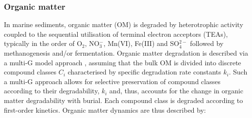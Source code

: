 \documentclass[gmd, manuscript]{copernicus}
\begin{document}
\subsubsection{Organic matter}
In marine sediments, organic matter (OM) is degraded by heterotrophic activity coupled to the sequential utilisation of terminal electron acceptors (TEAs), typically in the order of O$_2$, NO$_3^-$, Mn(VI), Fe(III) and SO$_4^{2-}$ 
followed by methanogenesis and/or fermentation. Organic matter degradation is described via a multi-G model approach \citep[][and references therein]{arndt_quantifying_2013}, assuming that the bulk OM is divided 
into discrete compound classes $C_i$ characterised by specific degradation rate constants $k_i$. Such a multi-G approach allows for selective preservation of compound classes according to their degradability, $k_i$ and, thus, 
accounts for the change in organic matter degradability with burial. Each compound class is degraded according to first-order kinetics. Organic matter dynamics are thus described by:
\end{document}
